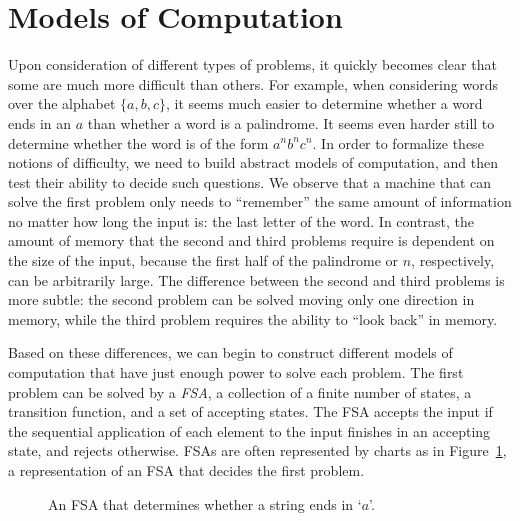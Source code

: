 \documentclass[psamsfonts]{amsart}
\theoremstyle{definition}
\theoremstyle{remark}
\numberwithin{equation}{section}
\begin{document}
\section{Models of Computation}
Upon consideration of different types of problems, it quickly becomes clear that
some are much more difficult than others. For example, when considering words
over the alphabet $\{a,b,c\}$, it seems much easier to determine whether a word
ends in an $a$ than whether a word is a palindrome. It seems even harder still
to determine whether the word is of the form $a^nb^nc^n$. In order to formalize
these notions of difficulty, we need to build abstract models of computation,
and then test their ability to decide such questions. We observe that a machine
that can solve the first problem only needs to ``remember'' the same amount of
information no matter how long the input is: the last letter of the word. In
contrast, the amount of memory that the second and third problems require is
dependent on the size of the input, because the first half of the palindrome or
$n$, respectively, can be arbitrarily large. The difference between the second
and third problems is more subtle: the second problem can be solved moving only
one direction in memory, while the third problem requires the ability to ``look
back'' in memory.
\par
Based on these differences, we can begin to construct different models of
computation that have just enough power to solve each problem. The first problem
can be solved by a \emph{\ac{FSA}}, a collection of a finite
number of states, a transition function, and a set of accepting states. The
\ac{FSA} accepts the input if the sequential application of each element to the
input finishes in an accepting state, and rejects otherwise. \aclp{FSA} are often represented by charts as in Figure~\ref{fig:fsa}, a
representation of an \ac{FSA} that decides the first problem.
\begin{figure}[h]
  \caption{An \ac{FSA} that determines whether a string ends in
    `$a$'.}
  \label{fig:fsa}
\end{figure}
\par
\end{document}
